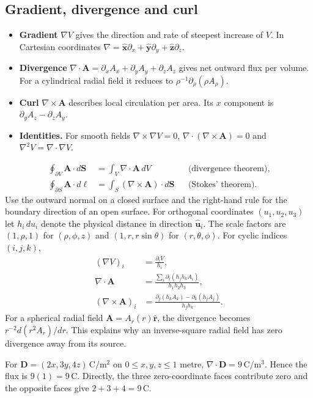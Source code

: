 \documentclass[12pt,a4paper]{article}
\begin{document}
\subsection{Gradient, divergence and curl}
\begin{itemize}[leftmargin=*,itemsep=3pt]
\item \textbf{Gradient} $\nabla V$ gives the direction and rate of steepest increase of $V$. In Cartesian coordinates $\nabla=\hat{\mathbf x}\partial_x+\hat{\mathbf y}\partial_y+\hat{\mathbf z}\partial_z$.
\item \textbf{Divergence} $\nabla\cdot\mathbf A=\partial_xA_x+\partial_yA_y+\partial_zA_z$ gives net outward flux per volume. For a cylindrical radial field it reduces to $\rho^{-1}\partial_\rho(\rho A_\rho)$.
\item \textbf{Curl} $\nabla\times\mathbf A$ describes local circulation per area. Its $x$ component is $\partial_y A_z-\partial_z A_y$.
\item \textbf{Identities.} For smooth fields $\nabla\times\nabla V=0$, $\nabla\cdot(\nabla\times\mathbf A)=0$ and $\nabla^2V=\nabla\cdot\nabla V$.
\end{itemize}
\[
\begin{aligned}
\oint_{\partial V}\mathbf A\cdot d\mathbf S&=\int_V\nabla\cdot\mathbf A\,dV
 &&\text{(divergence theorem)},\\
\oint_{\partial S}\mathbf A\cdot d\boldsymbol\ell&=\int_S(\nabla\times\mathbf A)\cdot d\mathbf S
 &&\text{(Stokes' theorem)}.
\end{aligned}
\]
Use the outward normal on a closed surface and the right-hand rule for the boundary direction of an open surface.
For orthogonal coordinates $(u_1,u_2,u_3)$ let $h_i\,du_i$ denote the physical distance in direction $\hat{\mathbf u}_i$. The scale factors are $(1,\rho,1)$ for $(\rho,\phi,z)$ and $(1,r,r\sin\theta)$ for $(r,\theta,\phi)$. For cyclic indices $(i,j,k)$,
\[
\begin{aligned}
(\nabla V)_i &= \frac{\partial_i V}{h_i},\\
\nabla\cdot\mathbf A
 &= \frac{\sum_i \partial_i(h_jh_kA_i)}{h_1h_2h_3},\\
(\nabla\times\mathbf A)_i
 &=\frac{\partial_j(h_k A_k)-\partial_k(h_j A_j)}{h_jh_k}.
\end{aligned}
\]
For a spherical radial field $\mathbf A=A_r(r)\hat{\mathbf r}$, the divergence becomes $r^{-2}d(r^2 A_r)/dr$. This explains why an inverse-square radial field has zero divergence away from its source.
\begin{tcolorbox}[examplebox,title={Outward flux through a unit cube}]
For $\mathbf D=(2x,3y,4z)\,\mathrm{C/m^2}$ on $0\le x,y,z\le1$ metre, $\nabla\cdot\mathbf D=9\,\mathrm{C/m^3}$. Hence the flux is $9(1)=9\,\mathrm C$. Directly, the three zero-coordinate faces contribute zero and the opposite faces give $2+3+4=9\,\mathrm C$.
\end{tcolorbox}
\end{document}
